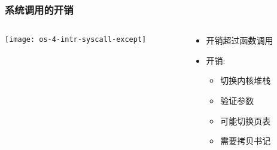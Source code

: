 \begin{frame}
	\frametitle{系统调用的开销}

	\begin{columns}
	
	\begin{column}{0.45\textwidth}
		\centering
		\texttt{[image: os-4-intr-syscall-except]}
		
	\end{column}
	
	\begin{column}{0.5\textwidth}
		
	\begin{itemize}
        \item 开销超过函数调用 \pause
        \item 开销:
	    \begin{itemize}

	        \item 切换内核堆栈
	        \item 验证参数
	        \item 可能切换页表
        	\item 需要拷贝书记

    	\end{itemize}
	\end{itemize}

	\end{column}

\end{columns}

\end{frame}


